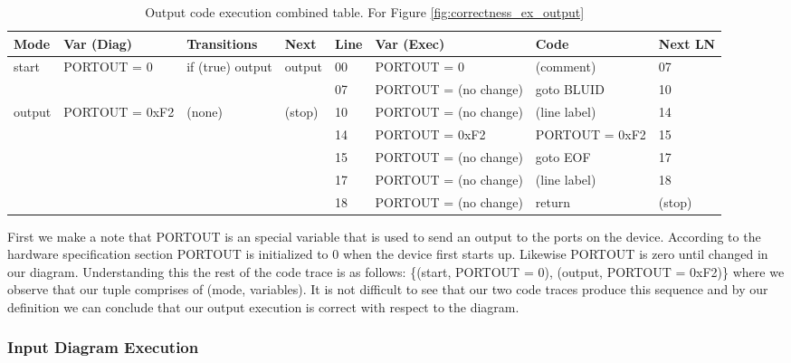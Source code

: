 \begin{table}[htcb]
	\caption{Output code execution combined table. For Figure \ref{fig:correctness_ex_output}}
	\centering
	\tablefontsize
		\begin{tabular}{| p{} | p{} | p{} | p{} | p{} | p{} | p{} | p{} |}
			\hline
			\textbf{Mode} 		&	\textbf{Var (Diag)} 		& 	\textbf{Transitions} 		& 	\textbf{Next}		&	\textbf{Line}		&	\textbf{Var (Exec)	}	&	\textbf{Code}	&	\textbf{Next LN} \\
			\hline
			start 				&	PORTOUT = 0					&	if (true) output			&	output				&	00					&	PORTOUT = 0				& 	(comment)		&	07 \\
			\hline
								&								&								&						&	07					&   PORTOUT = (no change)	&	goto BLUID		&	10 \\
			\hline
			output				&	PORTOUT = 0xF2				&	(none)						&	(stop)				&	10					&	PORTOUT = (no change)	&	(line label)	&	14 \\
			\hline
								&								&								&						&	14					&	PORTOUT = 0xF2			&	PORTOUT = 0xF2	&	15 \\
			\hline
								&								&								&						&	15					&	PORTOUT = (no change)	&	goto EOF		&	17 \\
			\hline
								&								&								&						&	17					&	PORTOUT = (no change)	&	(line label)	&	18 \\
			\hline
								&								&								&						&	18					&	PORTOUT = (no change)	&	return			&	(stop) \\
			\hline
		\end{tabular}
	\label{table:OutputExecCombined}
\end{table}

First we make a note that PORTOUT is an special variable that is 
used to send an output to the ports on the device.
According to the hardware specification section PORTOUT is initialized 
to 0 when the device first starts up. Likewise PORTOUT is zero until 
changed in our diagram. Understanding this the rest of the code trace 
is as follows: \{(start, PORTOUT = 0), (output, PORTOUT = 0xF2)\} where
we observe that our tuple comprises of (mode, variables). 
It is not difficult to see that our two code traces produce this
sequence and by our definition we can conclude that our
output execution is correct with respect to the diagram.


\subsubsection{Input Diagram Execution}

